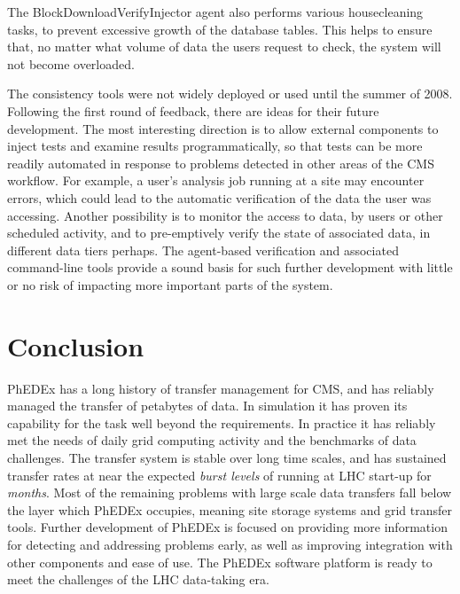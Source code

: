 \documentclass{PoS}
\begin{document}
The BlockDownloadVerifyInjector agent also performs various
housecleaning tasks, to prevent excessive growth of the database
tables. This helps to ensure that, no matter what volume of data the
users request to check, the system will not become overloaded.

The consistency tools were not widely deployed or used until the
summer of 2008. Following the first round of feedback, there are ideas
for their future development. The most interesting direction is to
allow external components to inject tests and examine results
programmatically, so that tests can be more readily automated in
response to problems detected in other areas of the CMS workflow. For
example, a user's analysis job running at a site may encounter errors,
which could lead to the automatic verification of the data the user
was accessing. Another possibility is to monitor the access to data,
by users or other scheduled activity, and to pre-emptively verify the
state of associated data, in different data tiers perhaps. The
agent-based verification and associated command-line tools provide a
sound basis for such further development with little or no risk of
impacting more important parts of the system.

\section{Conclusion}

PhEDEx has a long history of transfer management for CMS, and has
reliably managed the transfer of petabytes of data.  In simulation it
has proven its capability for the task well beyond the requirements.
In practice it has reliably met the needs of daily grid computing
activity and the benchmarks of data challenges.  The transfer system
is stable over long time scales, and has sustained transfer rates at
near the expected \emph{burst levels} of running at LHC start-up for
\emph{months}.  Most of the remaining problems with large scale data
transfers fall below the layer which PhEDEx occupies, meaning site
storage systems and grid transfer tools.  Further development of
PhEDEx is focused on providing more information for detecting and
addressing problems early, as well as improving integration with other
components and ease of use.  The PhEDEx software platform is ready to
meet the challenges of the LHC data-taking era.



\end{document}
